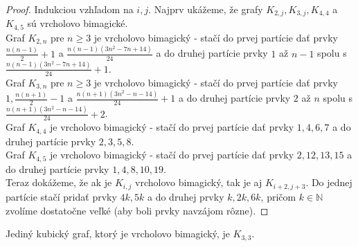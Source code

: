 \begin{proof} Indukciou vzhľadom na $i,j$. Najprv ukážeme, že grafy $K_{2,j}, K_{3,j}, K_{4,4}$ a $K_{4,5}$ sú vrcholovo bimagické. \\

Graf $K_{2,n}$ pre $n \geq 3$ je vrcholovo bimagický - stačí do prvej partície dať prvky $\frac{n(n-1)}{2} + 1$ a $\frac{n(n-1)(3n^2 - 7n + 14)}{24}$ a do druhej partície prvky $1$ až $n - 1$ spolu s $\frac{n(n-1)(3n^2 - 7n + 14)}{24} + 1$. \\

Graf $K_{3,n}$ pre $n \geq 3$ je vrcholovo bimagický - stačí do prvej partície dať prvky $1, \frac{n(n+1)}{2} - 1$ a $\frac{n(n+1)(3n^2 - n - 14)}{24} + 1$ a do druhej partície prvky $2$ až $n$ spolu s $\frac{n(n+1)(3n^2 - n - 14)}{24} + 2$. \\

Graf $K_{4,4}$ je vrcholovo bimagický - stačí do prvej partície dať prvky $1, 4, 6, 7$ a do druhej partície prvky $2, 3, 5, 8$. \\

Graf $K_{4,5}$ je vrcholovo bimagický - stačí do prvej partície dať prvky $2, 12, 13, 15$ a do druhej partície prvky $1, 4, 8, 10, 19$. \\

Teraz dokážeme, že ak je $K_{i,j}$ vrcholovo bimagický, tak je aj $K_{i+2,j+3}$. Do jednej partície stačí pridať prvky $4k, 5k$ a do druhej prvky $k, 2k, 6k$, pričom $k \in \mathbb{N}$ zvolíme dostatočne veľké (aby boli prvky navzájom rôzne).
\end{proof}

\begin{theorem} Jediný kubický graf, ktorý je vrcholovo bimagický, je $K_{3,3}$.
\end{theorem}

